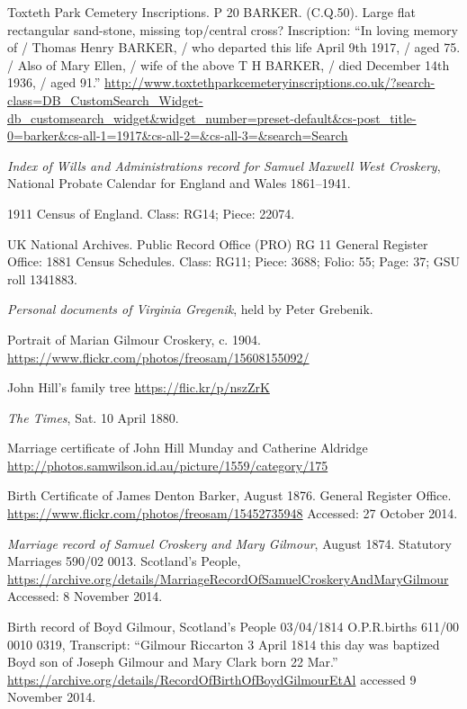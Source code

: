 \begin{thebibliography}{99}
	Toxteth Park Cemetery Inscriptions. P 20 BARKER. (C.Q.50).
	Large flat rectangular sand-stone, missing top/central cross? Inscription:
	``In loving memory of / Thomas Henry BARKER, / who departed this life April 9th 1917, / aged 75. /
	Also of Mary Ellen, / wife of the above T H BARKER, / died December 14th 1936, / aged 91.''
	\url{http://www.toxtethparkcemeteryinscriptions.co.uk/?search-class=DB_CustomSearch_Widget-db_customsearch_widget&widget_number=preset-default&cs-post_title-0=barker&cs-all-1=1917&cs-all-2=&cs-all-3=&search=Search}

	\emph{Index of Wills and Administrations record for Samuel Maxwell West Croskery},
	National Probate Calendar for England and Wales 1861--1941.

	1911 Census of England. Class: RG14; Piece: 22074.

	UK National Archives. Public Record Office (PRO) RG 11 General Register Office: 1881 Census Schedules.
	Class: RG11; Piece: 3688; Folio: 55; Page: 37; GSU roll 1341883.

	\emph{Personal documents of Virginia Gregenik}, held by Peter Grebenik.

	Portrait of Marian Gilmour Croskery, c. 1904.
	\url{https://www.flickr.com/photos/freosam/15608155092/}

	John Hill's family tree \url{https://flic.kr/p/nszZrK}

	\emph{The Times}, Sat. 10 April 1880. 

	Marriage certificate of John Hill Munday and Catherine Aldridge
	\url{http://photos.samwilson.id.au/picture/1559/category/175}

	Birth Certificate of James Denton Barker, August 1876. General Register Office.
	\url{https://www.flickr.com/photos/freosam/15452735948}
	Accessed: 27 October 2014.

	\emph{Marriage record of Samuel Croskery and Mary Gilmour}, August 1874.
	Statutory Marriages 590/02 0013. Scotland's People,
	\url{https://archive.org/details/MarriageRecordOfSamuelCroskeryAndMaryGilmour}
	Accessed: 8 November 2014.

	Birth record of Boyd Gilmour,
	Scotland's People 03/04/1814 O.P.R.births 611/00 0010 0319,
	Transcript: ``Gilmour Riccarton 3 April 1814 this day was baptized Boyd son of Joseph Gilmour and Mary Clark born 22 Mar.''
	\url{https://archive.org/details/RecordOfBirthOfBoydGilmourEtAl} accessed 9 November 2014.


\end{thebibliography}
